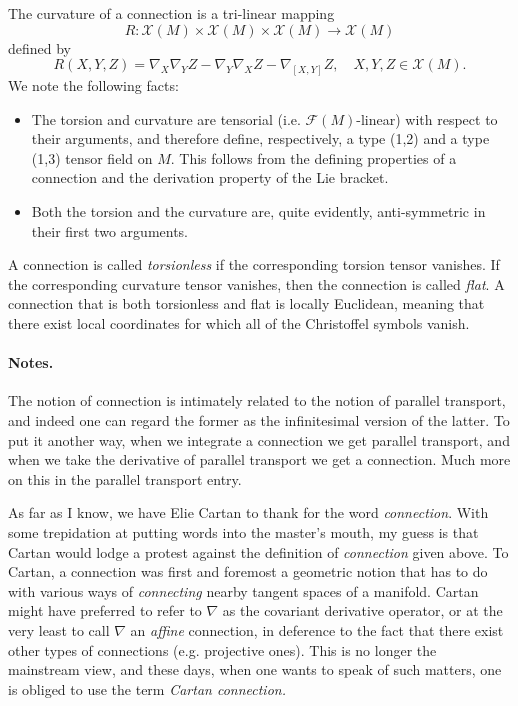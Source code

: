 \documentclass[12pt]{article}
\newcommand{\vs}{\mathcal{X}}
\newcommand{\fs}{\mathcal{F}}
\begin{document}
The curvature of a connection is a tri-linear mapping
$$R:\vs(M)\times\vs(M)\times\vs(M)\rightarrow\vs(M)$$
defined by
$$R(X,Y,Z) = \nabla_X \nabla_Y Z - \nabla_Y \nabla_X Z -
\nabla_{[X,Y]} Z,
\quad X,Y,Z\in\vs(M).$$
We note the following facts:
\begin{itemize}
\item 
  The torsion and curvature are tensorial (i.e. $\fs(M)$-linear) with
  respect to their
  arguments, and therefore define, respectively, a type (1,2) and a
  type (1,3) tensor field on $M$.  This follows from the defining
  properties of a connection and the derivation property of the Lie
  bracket. 
\item 
Both the torsion and the curvature are, quite evidently,
anti-symmetric in their first two arguments.
\end{itemize}

A connection is called {\em torsionless} if the corresponding torsion
tensor vanishes.  If the corresponding curvature tensor vanishes, then
the connection is called {\em flat}.  A connection that is both
torsionless and flat is locally Euclidean, meaning that there exist
local coordinates for which all of the Christoffel symbols vanish.

\paragraph{Notes.}
The notion of connection is  intimately related to the notion of
parallel transport, and indeed one can regard the former as the
infinitesimal version of the latter.  To put it another way, when we
integrate a connection we get parallel transport, and when we take the
derivative of parallel transport we get a connection.  Much more on
this in the parallel transport entry.

As far as I know, we have Elie Cartan to thank for the word {\em
  connection}.  With some trepidation at putting words into the
master's mouth, my guess is that Cartan would lodge a protest against
the definition of {\em connection} given above.  To Cartan, a connection
was first and foremost a geometric notion that has to do with various
ways of {\em connecting} nearby tangent spaces of a manifold.  Cartan
might have preferred to refer to $\nabla$ as the covariant derivative
operator, or at the very least to call $\nabla$ an {\em affine}
connection, in deference to the fact that there exist other types of
connections (e.g. projective ones).  This is no longer the mainstream
view, and these days, when one wants to speak of such matters, one is
obliged to use the term {\em Cartan connection.}
\end{document}
